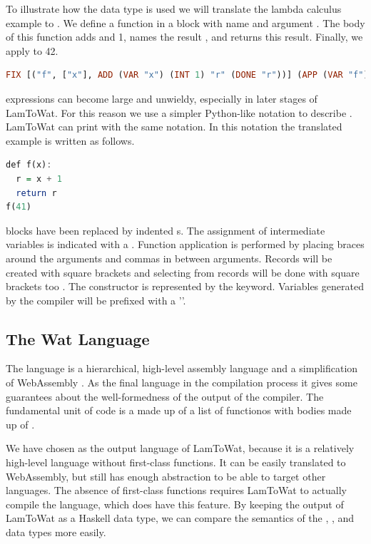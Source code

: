 {To illustrate how the  data type is used we will translate the lambda calculus example  to . We define a function in a  block with name  and argument . The body of this function adds  and 1, names the result , and returns this result. Finally, we apply  to 42.

\begin{lstlisting}[language=Haskell]
  FIX [("f", ["x"], ADD (VAR "x") (INT 1) "r" (DONE "r"))] (APP (VAR "f") [INT 41])
\end{lstlisting}

 expressions can become large and unwieldy, especially in later stages of LamToWat. For this reason we use a simpler Python-like notation to describe . LamToWat can print  with the same notation. In this notation the translated example is written as follows.

\begin{lstlisting}[language=Haskell]
def f(x):
  r = x + 1
  return r
f(41)
\end{lstlisting}

 blocks have been replaced by indented s. The assignment of intermediate variables is indicated with a \icode{=}. Function application is performed by placing braces around the arguments and commas in between arguments. Records will be created with square brackets \icode{[1,2,3]} and selecting from records will be done with square brackets too . The  constructor is represented by the  keyword. Variables generated by the compiler will be prefixed with a '\icode{_}'.

\subsection{\label{subsection:webdata}The Wat Language}
The  language is a hierarchical, high-level assembly language and a simplification of WebAssembly \autocite{webassemblyhomepage}. As the final language in the compilation process it gives some guarantees about the well-formedness of the output of the compiler. The fundamental unit of code is a  made up of a list of functionos with bodies made up of .

We have chosen  as the output language of LamToWat, because it is a relatively high-level language without first-class functions. It can be easily translated to WebAssembly, but still has enough abstraction to be able to target other languages. The absence of first-class functions requires LamToWat to actually compile the  language, which does have this feature. By keeping the output of LamToWat as a Haskell data type, we can compare the semantics of the , , and  data types more easily.

}
